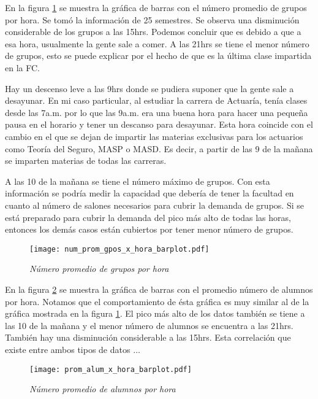 En la figura \ref{num_prom_gpos_x_hora_barplot} se muestra la gráfica de barras con el número promedio de grupos por hora. Se tomó la información de 25 semestres. Se observa una disminución considerable de los grupos a las 15hrs. Podemos concluir que es debido a que a esa hora, usualmente la gente sale a comer. A las 21hrs se tiene el menor número de grupos, esto se puede explicar por el hecho de que es la última clase impartida en la FC.

Hay un descenso leve a las 9hrs donde se pudiera suponer que la gente sale a desayunar. En mi caso particular, al estudiar la carrera de Actuaría, tenía clases desde las 7a.m. por lo que las 9a.m. era una buena hora para hacer una pequeña pausa en el horario y tener un descanso para desayunar. Esta hora coincide con el cambio en el que se dejan de impartir las materias exclusivas para los actuarios como Teoría del Seguro, MASP o MASD. Es decir, a partir de las 9 de la mañana se imparten materias de todas las carreras.

A las 10 de la mañana se tiene el número máximo de grupos. Con esta información se podría medir la capacidad que debería de tener la facultad en cuanto al número de salones necesarios para cubrir la demanda de grupos. Si se está preparado para cubrir la demanda del pico más alto de todas las horas, entonces los demás casos están cubiertos por tener menor número de grupos.


\begin{figure}[H]
\centering
\texttt{[image: num\_prom\_gpos\_x\_hora\_barplot.pdf]} %
\caption{\textit{Número promedio de grupos por hora}}\label{num_prom_gpos_x_hora_barplot}
\end{figure}

En la figura \ref{prom_alum_x_hora_barplot} se muestra la gráfica de barras con el promedio número de alumnos por hora. Notamos que el comportamiento de ésta gráfica es muy similar al de la gráfica mostrada en la figura \ref{num_prom_gpos_x_hora_barplot}. El pico más alto de los datos también se tiene a las 10 de la mañana y el menor número de alumnos se encuentra a las 21hrs. También hay una disminución considerable a las 15hrs. Esta correlación que existe entre ambos tipos de datos $\ldots$

\begin{figure}[H]
\centering
\texttt{[image: prom\_alum\_x\_hora\_barplot.pdf]} %
\caption{\textit{Número promedio de alumnos por hora}}\label{prom_alum_x_hora_barplot}
\end{figure}

